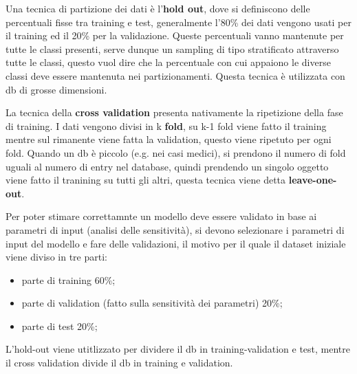 \documentclass[12pt]{article}
\begin{document}
Una tecnica di partizione dei dati \`e l'\textbf{hold out}, dove si definiscono delle percentuali fisse tra training e test, generalmente l'80\% dei dati vengono usati per il training ed il 20\% per la validazione. Queste percentuali vanno mantenute per tutte le classi presenti, serve dunque un sampling di tipo stratificato attraverso tutte le classi, questo vuol dire che la percentuale con cui appaiono le diverse classi deve essere mantenuta nei partizionamenti. Questa tecnica \`e utilizzata con db di grosse dimensioni.

La tecnica della \textbf{cross validation} presenta nativamente la ripetizione della fase di training. I dati vengono divisi in k \textbf{fold}, su k-1 fold viene fatto il training mentre sul rimanente viene fatta la validation, questo viene ripetuto per ogni fold. Quando un db \`e piccolo (e.g. nei casi medici), si prendono il numero di fold uguali al numero di entry nel database, quindi prendendo un singolo oggetto viene fatto il tranining su tutti gli altri, questa tecnica viene detta \textbf{leave-one-out}.

Per poter stimare correttamnte un modello deve essere validato in base ai parametri di input (analisi delle sensitivit\`a), si devono selezionare i parametri di input del modello e fare delle validazioni, il motivo per il quale il dataset iniziale viene diviso in tre parti:
\begin{itemize}
    \item parte di training 60\%;
    \item parte di validation (fatto sulla sensitivit\`a dei parametri) 20\%;
    \item parte di test 20\%;
\end{itemize}
L'hold-out viene utitlizzato per dividere il db in training-validation e test, mentre il cross validation divide il db in training e validation.
\end{document}
